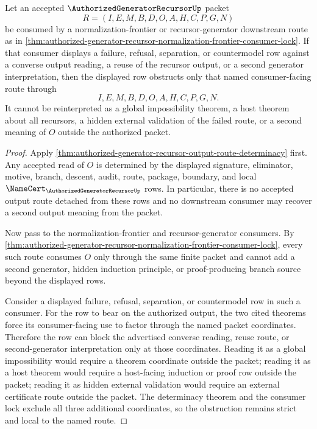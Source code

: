 \begin{corollary}
\label{cor:authorized-generator-recursor-output-route-strict-local-obstruction}
Let an accepted $\AuthorizedGeneratorRecursorUp$ packet
$$
R=(I,E,M,B,D,O,A,H,C,P,G,N)
$$
be consumed by a normalization-frontier or recursor-generator downstream route as in \autoref{thm:authorized-generator-recursor-normalization-frontier-consumer-lock}. If that consumer displays a failure, refusal, separation, or countermodel row against a converse output reading, a reuse of the recursor output, or a second generator interpretation, then the displayed row obstructs only that named consumer-facing route through
$$
I,E,M,B,D,O,A,H,C,P,G,N.
$$
It cannot be reinterpreted as a global impossibility theorem, a host theorem about all recursors, a hidden external validation of the failed route, or a second meaning of $O$ outside the authorized packet.
\end{corollary}
\begin{proof}
Apply \autoref{thm:authorized-generator-recursor-output-route-determinacy} first. Any accepted read of $O$ is determined by the displayed signature, eliminator, motive, branch, descent, audit, route, package, boundary, and local $\NameCert_{\AuthorizedGeneratorRecursorUp}$ rows. In particular, there is no accepted output route detached from these rows and no downstream consumer may recover a second output meaning from the packet.

Now pass to the normalization-frontier and recursor-generator consumers. By \autoref{thm:authorized-generator-recursor-normalization-frontier-consumer-lock}, every such route consumes $O$ only through the same finite packet and cannot add a second generator, hidden induction principle, or proof-producing branch source beyond the displayed rows.

Consider a displayed failure, refusal, separation, or countermodel row in such a consumer. For the row to bear on the authorized output, the two cited theorems force its consumer-facing use to factor through the named packet coordinates. Therefore the row can block the advertised converse reading, reuse route, or second-generator interpretation only at those coordinates. Reading it as a global impossibility would require a theorem coordinate outside the packet; reading it as a host theorem would require a host-facing induction or proof row outside the packet; reading it as hidden external validation would require an external certificate route outside the packet. The determinacy theorem and the consumer lock exclude all three additional coordinates, so the obstruction remains strict and local to the named route.
\end{proof}
